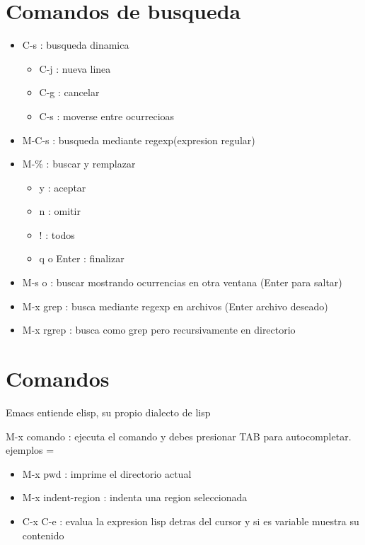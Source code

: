 \documentclass[a4paper, twocolumn]{article}
\begin{document}
\begin{landscape}
\begin{multicols}{2}
\section*{Comandos de busqueda}
\begin{multicols}{2}
\begin{itemize}
	\item C-s : busqueda dinamica
	\begin{itemize}
		\item C-j : nueva linea
		\item C-g : cancelar
		\item C-s : moverse entre ocurrecioas
	\end{itemize}
	\item M-C-s : busqueda mediante regexp(expresion regular)
	\item M-\% : buscar y remplazar
	\begin{itemize}
		\item y : aceptar
		\item n : omitir
		\item ! : todos		
		\item q o Enter : finalizar
	\end{itemize}
	\item M-s o : buscar mostrando ocurrencias en otra ventana (Enter para saltar)
	\item M-x grep : busca mediante regexp en archivos (Enter archivo deseado)
	\item M-x rgrep : busca como grep pero recursivamente en directorio
\end{itemize}
\end{multicols}

\section*{Comandos}
\begin{flushleft}
Emacs entiende elisp, su propio dialecto de lisp
	\begin{flushleft}
		M-x comando : ejecuta el comando y debes    				presionar TAB para autocompletar.
		ejemplos =
		\begin{itemize}
		    \item M-x pwd : imprime el directorio 					actual
			\item M-x indent-region : indenta una 					region seleccionada
			\item C-x C-e : evalua la expresion lisp 				detras del cursor y si es variable 						muestra su contenido
		\end{itemize}
			

\end{flushleft}
\end{flushleft}
\end{multicols}
\end{landscape}
\end{document}
